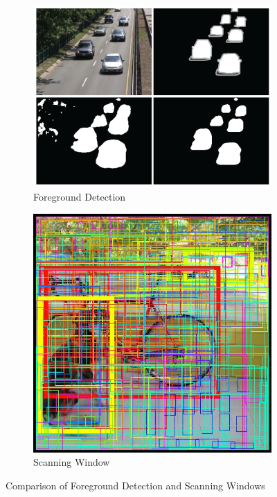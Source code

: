 \begin{figure}[ht]
	\begin{subfigure}[b]{.5\textwidth}
		\centering
		\includegraphics[width=.9\linewidth]{img/chapter2_background/robustBackgroundSubtraction.png}
		\caption{Foreground Detection \cite{Zeng2017}}
	\end{subfigure}%
	\hspace{\fill} 
	\begin{subfigure}[b]{.5\textwidth}
		\centering
		\includegraphics[width=.675\linewidth]{img/chapter2_background/yoloBBBoxes.png}
		\caption{Scanning Window \cite{Redmon}}
	\end{subfigure}
	
	\begin{center}
		\caption{Comparison of Foreground Detection and Scanning Windows}
		\label{fig:HDS_Test_Locations}
	\end{center}
\end{figure}

